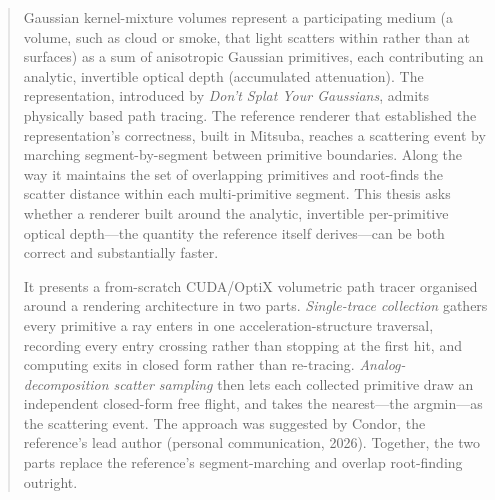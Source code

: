 \vspace*{-3\baselineskip}
\begin{abstract}
\setlength{\parskip}{2.5pt plus 1pt}%

Gaussian kernel-mixture volumes represent a participating medium (a volume, such as cloud or
smoke, that light scatters within rather than at surfaces) as a sum of anisotropic Gaussian
primitives, each contributing an analytic, invertible optical depth (accumulated attenuation). The representation, introduced by
\emph{Don't Splat Your Gaussians}, admits physically based path tracing. The reference renderer that established the
representation's correctness, built in Mitsuba, reaches a scattering event by marching
segment-by-segment between primitive boundaries. Along the way it maintains the set of overlapping
primitives and root-finds the scatter distance within each multi-primitive segment. This thesis asks whether a renderer built around the analytic, invertible per-primitive
optical depth---the quantity the reference itself derives---can be both correct and
substantially faster.

It presents a from-scratch CUDA/OptiX volumetric path tracer organised around a rendering architecture in two parts. \emph{Single-trace collection} gathers every primitive a ray enters in one
acceleration-structure traversal, recording every entry crossing rather than stopping at
the first hit, and computing exits in closed form rather than re-tracing. \emph{Analog-decomposition
scatter sampling} then lets each collected primitive draw an independent closed-form free flight,
and takes the nearest---the argmin---as the scattering event. The approach was suggested by Condor, the reference's lead author (personal communication, 2026). Together, the two parts replace the
reference's segment-marching and overlap root-finding outright.


\end{abstract}
